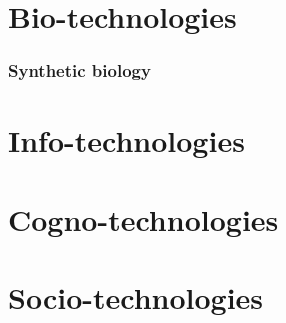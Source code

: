 \documentclass{beamer}
\begin{document}
\section{Bio-technologies}
\begin{frame}
	\frametitle{Synthetic biology}
	
\end{frame}

\section{Info-technologies}

\section{Cogno-technologies}

\section{Socio-technologies}
\end{document}
